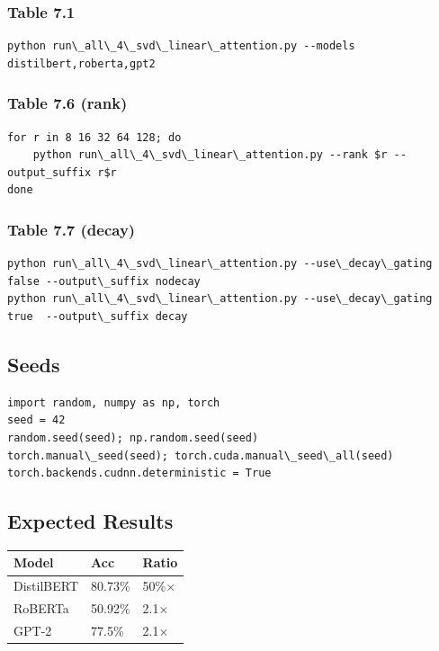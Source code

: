 \subsubsection{Table 7.1}
\begin{lstlisting}
python run\_all\_4\_svd\_linear\_attention.py --models distilbert,roberta,gpt2
\end{lstlisting}

\subsubsection{Table 7.6 (rank)}
\begin{lstlisting}
for r in 8 16 32 64 128; do
    python run\_all\_4\_svd\_linear\_attention.py --rank $r --output_suffix r$r
done
\end{lstlisting}

\subsubsection{Table 7.7 (decay)}
\begin{lstlisting}
python run\_all\_4\_svd\_linear\_attention.py --use\_decay\_gating false --output\_suffix nodecay
python run\_all\_4\_svd\_linear\_attention.py --use\_decay\_gating true  --output\_suffix decay
\end{lstlisting}

\subsection{Seeds}

\begin{lstlisting}
import random, numpy as np, torch
seed = 42
random.seed(seed); np.random.seed(seed)
torch.manual\_seed(seed); torch.cuda.manual\_seed\_all(seed)
torch.backends.cudnn.deterministic = True
\end{lstlisting}

\subsection{Expected Results}

\begin{table}[H]
\centering
\small
\begin{tabular}{lll}
\toprule
\textbf{Model} & \textbf{Acc} & \textbf{Ratio} \\
\midrule
DistilBERT & 80.73\% & 50\%$\times$ \\
RoBERTa & 50.92\% & 2.1$\times$ \\
GPT-2 & 77.5\% & 2.1$\times$ \\
\bottomrule
\end{tabular}
\end{table}

